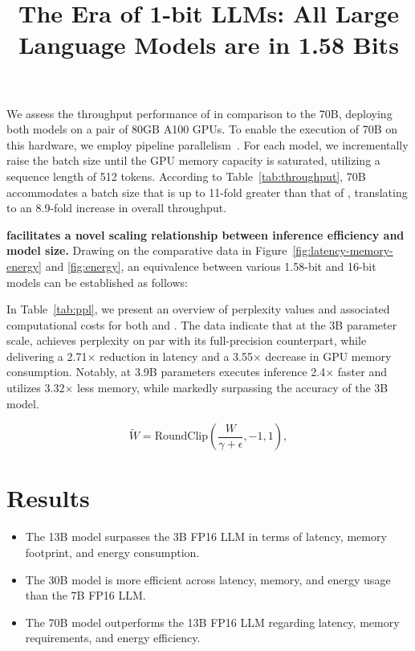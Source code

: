 \title{The Era of 1-bit LLMs: All Large Language Models are in 1.58 Bits}
We assess the throughput performance of  in comparison to the  70B, deploying both models on a pair of 80GB A100 GPUs. To enable the execution of  70B on this hardware, we employ pipeline parallelism~\cite{gpipe}. For each model, we incrementally raise the batch size until the GPU memory capacity is saturated, utilizing a sequence length of 512 tokens. According to Table~\ref{tab:throughput},  70B accommodates a batch size that is up to 11-fold greater than that of , translating to an 8.9-fold increase in overall throughput.

\textbf{ facilitates a novel scaling relationship between inference efficiency and model size.} Drawing on the comparative data in Figure~\ref{fig:latency-memory-energy} and \ref{fig:energy}, an equivalence between various 1.58-bit and 16-bit models can be established as follows:

In Table~\ref{tab:ppl}, we present an overview of perplexity values and associated computational costs for both  and . The data indicate that at the 3B parameter scale,  achieves perplexity on par with its full-precision  counterpart, while delivering a 2.71$\times$ reduction in latency and a 3.55$\times$ decrease in GPU memory consumption. Notably,  at 3.9B parameters executes inference 2.4$\times$ faster and utilizes 3.32$\times$ less memory, while markedly surpassing the accuracy of the  3B model.

\begin{equation}
    \widetilde{W} = \mathrm{RoundClip}\left(\frac{W}{\gamma + \epsilon}, -1, 1\right),
\end{equation}

\section{Results}

\begin{itemize}
    \item The 13B  model surpasses the 3B FP16 LLM in terms of latency, memory footprint, and energy consumption.
    \item The 30B  model is more efficient across latency, memory, and energy usage than the 7B FP16 LLM.
    \item The 70B  model outperforms the 13B FP16 LLM regarding latency, memory requirements, and energy efficiency.
\end{itemize}

